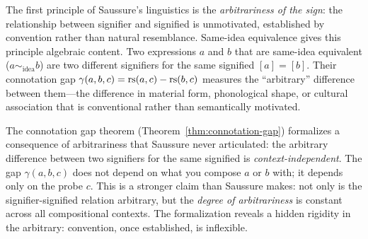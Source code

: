 \begin{interpretation}\label{interp:ch6:saussure_arbitrariness}
The first principle of Saussure's linguistics is the \emph{arbitrariness
of the sign}: the relationship between signifier and signified is
unmotivated, established by convention rather than natural resemblance.
Same-idea equivalence gives this principle algebraic content. Two
expressions $a$ and $b$ that are same-idea equivalent ($a \sim_{\text{idea}}
b$) are two different signifiers for the same signified $[a] = [b]$.
Their connotation gap $\gamma(a, b, c) = \mathrm{rs}(a, c) - \mathrm{rs}(b, c)$ measures
the ``arbitrary'' difference between them---the difference in material
form, phonological shape, or cultural association that is conventional
rather than semantically motivated.

The connotation gap theorem (Theorem~\ref{thm:connotation-gap}) formalizes
a consequence of arbitrariness that Saussure never articulated: the
arbitrary difference between two signifiers for the same signified is
\emph{context-independent}. The gap $\gamma(a, b, c)$ does not depend
on what you compose $a$ or $b$ with; it depends only on the probe $c$.
This is a stronger claim than Saussure makes: not only is the
signifier-signified relation arbitrary, but the \emph{degree of
arbitrariness} is constant across all compositional contexts. The
formalization reveals a hidden rigidity in the arbitrary: convention,
once established, is inflexible.
\end{interpretation}

